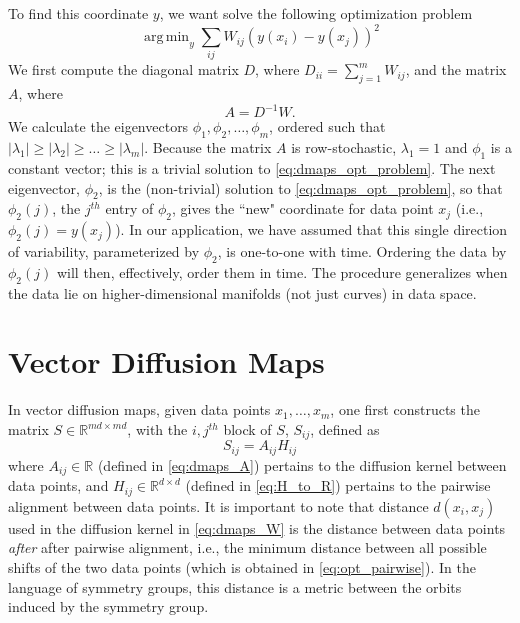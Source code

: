 \documentclass{pnastwo}
\DeclareMathOperator*{\argmin}{arg\,min}
\begin{document}
\begin{article}
\begin{materials}
To find this coordinate $y$, we want solve the following optimization problem \cite{Belkin2003}
\begin{equation} \label{eq:dmaps_opt_problem}
\argmin_{y} \sum_{ij} W_{ij} (y(x_i) - y(x_j))^2
\end{equation}
%
We first compute the diagonal matrix $D$, where $D_{ii} = \sum_{j=1}^{m} W_{ij}$, and the matrix $A$, where
\begin{equation} \label{eq:dmaps_A}
A = D^{-1} W.
\end{equation}
%
We calculate the eigenvectors $\phi_1, \phi_2, \dots, \phi_m$, ordered such that $|\lambda_1| \ge |\lambda_2| \ge \dots \ge |\lambda_m|$.
%
%
Because the matrix $A$ is row-stochastic, $\lambda_1=1$ and $\phi_1$ is a constant vector; this is a trivial solution to \eqref{eq:dmaps_opt_problem}.
%
%
The next eigenvector, $\phi_2$, is the (non-trivial) solution to \eqref{eq:dmaps_opt_problem}, so that $\phi_2(j)$, the $j^{th}$ entry of $\phi_2$, gives the ``new" coordinate for data point $x_j$ (i.e., $\phi_2(j) = y(x_j)$).
%
In our application, we have assumed that this single direction of variability, parameterized by $\phi_2$, is one-to-one with time.
%
Ordering the data by $\phi_2(j)$ will then, effectively, order them in time.
%
The procedure generalizes when the data lie on higher-dimensional manifolds (not just curves) in data space.

\section{Vector Diffusion Maps \cite{singer2012vector}}

In vector diffusion maps, given data points $x_1, \dots, x_m$, one first constructs the matrix $S \in \mathbb{R}^{md \times md}$, with the $i,j^{th}$ block of $S$, $S_{ij}$, defined as
\begin{equation} \label{eq:vdm_S}
	S_{ij} = A_{ij} H_{ij}
\end{equation}
%
where $A_{ij} \in \mathbb{R}$ (defined in \eqref{eq:dmaps_A}) pertains to the diffusion kernel between data points, and $H_{ij} \in \mathbb{R}^{d \times d}$ (defined in \eqref{eq:H_to_R}) pertains to the pairwise alignment between data points.
%
It is important to note that distance $d(x_i, x_j)$ used in the diffusion kernel in \eqref{eq:dmaps_W} is the distance between data points {\em after} after pairwise alignment, i.e., the minimum distance between all possible shifts of the two data points (which is obtained in \eqref{eq:opt_pairwise}).
%
In the language of symmetry groups, this distance is a metric between the orbits induced by the symmetry group.


\end{materials}
\end{article}
\end{document}
